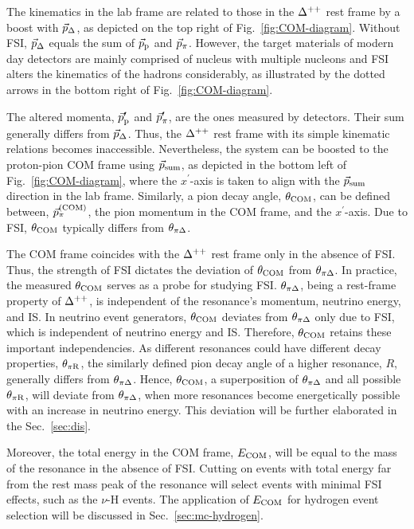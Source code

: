 The kinematics in the lab frame are related to those in the $\Delta^{++}$ rest frame by a boost with $\vec{p}_{\Delta}$, as depicted on the top right of Fig.~\ref{fig:COM-diagram}. 
Without FSI, $\vec{p}_{\Delta}$ equals the sum of $\vec{p}_\textrm{p}$ and $\vec{p}_{\pi}$.
However, the target materials of modern day detectors are mainly comprised of nucleus with multiple nucleons and FSI alters the kinematics of the hadrons considerably, as illustrated by the dotted arrows in the bottom right of Fig.~\ref{fig:COM-diagram}.

The altered momenta, $\vec{p}_\textrm{p}^{\prime}$ and $\vec{p}_{\pi}^{\prime}$, are the ones measured by detectors. 
Their sum generally differs from $\vec{p}_{\Delta}$.
Thus, the $\Delta^{++}$ rest frame with its simple kinematic relations becomes inaccessible.
Nevertheless, the system can be boosted to the proton-pion COM frame using $\vec{p}_{\textrm{sum}}$, as depicted in the bottom left of Fig.~\ref{fig:COM-diagram}, where the $x^{\prime}$-axis is taken to align with the $\vec{p}_{\textrm{sum}}$ direction in the lab frame.
Similarly, a pion decay angle, $\theta_{\textrm{COM}}$, can be defined between, $\vec{p}_{\pi}^{(\textrm{COM})}$, the pion momentum in the COM frame, and the $x^{\prime}$-axis.
Due to FSI, $\theta_{\textrm{COM}}$ typically differs from $\theta_{\pi\Delta}$. 

The COM frame coincides with the $\Delta^{++}$ rest frame only in the absence of FSI.
Thus, the strength of FSI dictates the deviation of $\theta_{\textrm{COM}}$ from $\theta_{\pi\Delta}$. 
In practice, the measured $\theta_{\textrm{COM}}$ serves as a probe for studying FSI. 
$\theta_{\pi\Delta}$, being a rest-frame property of $\Delta^{++}$, is independent of the resonance's momentum, neutrino energy, and IS.
In neutrino event generators, $\theta_{\textrm{COM}}$ deviates from $\theta_{\pi\Delta}$ only due to FSI, which is independent of neutrino energy and IS.
Therefore, $\theta_{\textrm{COM}}$ retains these important independencies.
As different resonances could have different decay properties, $\theta_{\pi\textrm{R}}$, the similarly defined pion decay angle of a higher resonance, $R$, generally differs from $\theta_{\pi\Delta}$. 
Hence, $\theta_{\textrm{COM}}$, a superposition of $\theta_{\pi\Delta}$ and all possible $\theta_{\pi\textrm{R}}$, will deviate from $\theta_{\pi\Delta}$, when more resonances become energetically possible with an increase in neutrino energy. 
This deviation will be further elaborated in the Sec.~\ref{sec:dis}.

Moreover, the total energy in the COM frame, $E_{\textrm{COM}}$, will be equal to the mass of the resonance in the absence of FSI.
Cutting on events with total energy far from the rest mass peak of the resonance will select events with minimal FSI effects, such as the $\nu$-H events. 
The application of $E_{\textrm{COM}}$ for hydrogen event selection will be discussed in Sec.~\ref{sec:mc-hydrogen}.

